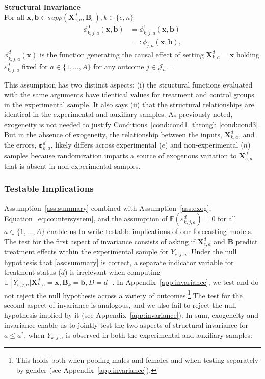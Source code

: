 \onehalfspacing
\begin{assumption} \label{ass:summary} \textbf{Structural Invariance}\\
For all $\bm{x}, \bm{b} \in supp(\bm{X}^d_{e,a}, \bm{B}_e), k \in \{e,n\}$
\begin{align}
\phi_{k,j,a}^0 \left( \bm{x}, \bm{b} \right) &= \phi_{k,j,a}^1 (\bm{x}, \bm{b}) \\   \nonumber
                                                                     &=: \phi_{j,a} (\bm{x}, \bm{b}),
\end{align}
$\phi^d_{k,j,a}(\bm{x})$ is the function generating the causal effect of setting $\bm{X}^d_{k,a}=\bm{x}$ holding $\varepsilon^d_{k,j,a}$ fixed for $a \in \{1,\dots,A\}$ for any outcome $j \in \mathcal{J}_{a}$. $\square$
\end{assumption}
\doublespacing

This assumption has two distinct aspects: (i) the structural functions evaluated with the same arguments have identical values for treatment and control groups in the experimental sample. It also says (ii) that the structural relationships are identical in the experimental and auxiliary samples. As previously noted, exogeneity is not needed to justify Conditions~\ref{cond:cond1} through \ref{cond:cond3}. But in the absence of exogeneity, the relationship between the inputs, $\bm{X}^d_{k,a}$, and the errors, $\bm{\varepsilon}^d_{k,a}$, likely differs across experimental ($e$) and non-experimental ($n$) samples because randomization imparts a source of exogenous variation to $\bm{X}^d_{e,a}$ that is absent in non-experimental samples.

\subsubsection{Testable Implications}

Assumption~\ref{ass:summary} combined with Assumption~\ref{ass:exog}, Equation~\eqref{eq:countersystem}, and the assumption of $\mathbb{E}(\varepsilon^d_{k,j,a})=0$ for all $a \in \{1,\dots,A\}$ enable us to write testable implications of our forecasting models. The test for the first aspect of invariance consists of asking if $\bm{X}_{e,a}^d$ and $\bm{B}$ predict treatment effects within the experimental sample for $Y_{e,j,a}$. Under the null hypothesis that \ref{ass:summary} is correct, a separate indicator variable for treatment status ($d$) is irrelevant when computing $\mathbb{E} \left[ Y_{e,j,a} | \bm{X}_{k,a}^d  = \bm{x}, \bm{B}_k =  \bm{b}, D = d \right]$. In  Appendix~\ref{app:invariance}, we test and do not reject the null hypothesis across a variety of outcomes.\footnote{This holds both when pooling males and females and when testing separately by gender (see  Appendix~\ref{app:invariance}).} The test for the second aspect of invariance is analogous, and we also fail to reject the null hypothesis implied by it (see Appendix~\ref{app:invariance}). In sum, exogeneity and invariance enable us to jointly test the two aspects of structural invariance for $a \leq a^*$, when $Y_{k,j,a}$ is observed in both the experimental and auxiliary samples: 

